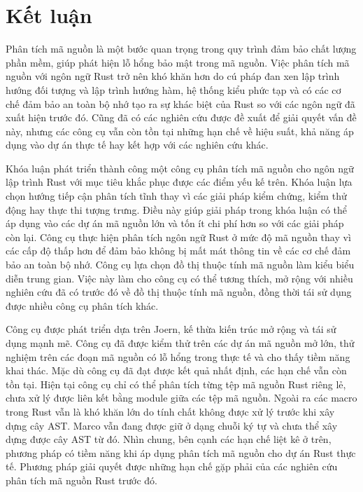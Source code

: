 \chapter*{Kết luận}

Phân tích mã nguồn là một bước quan trọng trong quy trình đảm bảo chất lượng phần mềm, giúp phát hiện lỗ hổng bảo mật trong mã nguồn.
Việc phân tích mã nguồn với ngôn ngữ Rust trở nên khó khăn hơn do cú pháp đan xen lập trình hướng đối tượng và lập trình hướng hàm, hệ thống kiểu  phức tạp và có các cơ chế đảm bảo an toàn bộ nhớ tạo ra sự khác biệt của Rust so với các ngôn ngữ đã xuất hiện trước đó.
Cũng đã có các nghiên cứu được đề xuất để giải quyết vấn đề này, nhưng các công cụ vẫn còn tồn tại những hạn chế về hiệu suất, khả năng áp dụng vào dự án thực tế hay kết hợp với các nghiên cứu khác.

Khóa luận phát triển thành công một công cụ phân tích mã nguồn cho ngôn ngữ lập trình Rust với mục tiêu khắc phục được các điểm yếu kế trên.
Khóa luận lựa chọn hướng tiếp cận phân tích tĩnh thay vì các giải pháp kiểm chứng, kiểm thử động hay thực thi tượng trưng.
Điều này giúp giải pháp trong khóa luận có thể áp dụng vào các dự án mã nguồn lớn và tốn ít chi phí hơn so với các giải pháp còn lại.
Công cụ thực hiện phân tích ngôn ngữ Rust ở mức độ mã nguồn thay vì các cấp độ thấp hơn để đảm bảo không bị mất mát thông tin về các cơ chế đảm bảo an toàn bộ nhớ.
Công cụ lựa chọn đồ thị thuộc tính mã nguồn làm kiểu biểu diễn trung gian.
Việc này làm cho công cụ có thể tương thích, mở rộng với nhiều nghiên cứu đã có trước đó về đồ thị thuộc tính mã nguồn, đồng thời tái sử dụng được nhiều công cụ phân tích khác.

Công cụ được phát triển dựa trên Joern, kế thừa kiến trúc mở rộng và tái sử dụng mạnh mẽ.
Công cụ đã được kiểm thử trên các dự án mã nguồn mở lớn, thử nghiệm trên các đoạn mã nguồn có lỗ hổng trong thực tế và cho thấy tiềm năng khai thác.
Mặc dù công cụ đã đạt được kết quả nhất định, các hạn chế vẫn còn tồn tại.
Hiện tại công cụ chỉ có thể phân tích từng tệp mã nguồn Rust riêng lẻ, chưa xử lý được liên kết bằng module giữa các tệp mã nguồn.
Ngoài ra các macro trong Rust vẫn là khó khăn lớn do tính chất không được xử lý trước khi xây dựng cây AST.
Marco vẫn đang được giữ ở dạng chuỗi ký tự và chưa thể xây dựng được cây AST từ đó.
Nhìn chung, bên cạnh các hạn chế liệt kê ở trên, phương pháp có tiềm năng khi áp dụng phân tích mã nguồn cho dự án Rust thực tế.
Phương pháp giải quyết được những hạn chế gặp phải của các nghiên cứu phân tích mã nguồn Rust trước đó.
